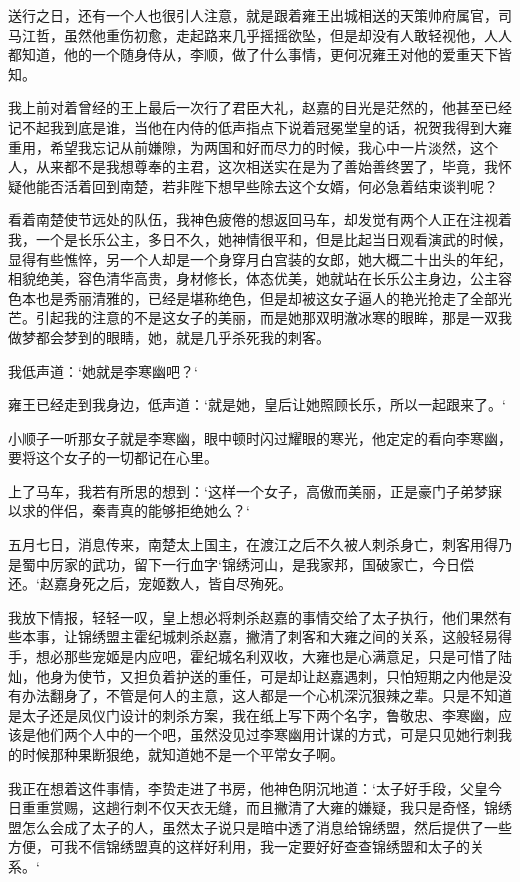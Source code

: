 送行之日，还有一个人也很引人注意，就是跟着雍王出城相送的天策帅府属官，司马江哲，虽然他重伤初愈，走起路来几乎摇摇欲坠，但是却没有人敢轻视他，人人都知道，他的一个随身侍从，李顺，做了什么事情，更何况雍王对他的爱重天下皆知。

我上前对着曾经的王上最后一次行了君臣大礼，赵嘉的目光是茫然的，他甚至已经记不起我到底是谁，当他在内侍的低声指点下说着冠冕堂皇的话，祝贺我得到大雍重用，希望我忘记从前嫌隙，为两国和好而尽力的时候，我心中一片淡然，这个人，从来都不是我想尊奉的主君，这次相送实在是为了善始善终罢了，毕竟，我怀疑他能否活着回到南楚，若非陛下想早些除去这个女婿，何必急着结束谈判呢？

看着南楚使节远处的队伍，我神色疲倦的想返回马车，却发觉有两个人正在注视着我，一个是长乐公主，多日不久，她神情很平和，但是比起当日观看演武的时候，显得有些憔悴，另一个人却是一个身穿月白宫装的女郎，她大概二十出头的年纪，相貌绝美，容色清华高贵，身材修长，体态优美，她就站在长乐公主身边，公主容色本也是秀丽清雅的，已经是堪称绝色，但是却被这女子逼人的艳光抢走了全部光芒。引起我的注意的不是这女子的美丽，而是她那双明澈冰寒的眼眸，那是一双我做梦都会梦到的眼睛，她，就是几乎杀死我的刺客。

我低声道：‘她就是李寒幽吧？‘

雍王已经走到我身边，低声道：‘就是她，皇后让她照顾长乐，所以一起跟来了。‘

小顺子一听那女子就是李寒幽，眼中顿时闪过耀眼的寒光，他定定的看向李寒幽，要将这个女子的一切都记在心里。

上了马车，我若有所思的想到：‘这样一个女子，高傲而美丽，正是豪门子弟梦寐以求的伴侣，秦青真的能够拒绝她么？‘

五月七日，消息传来，南楚太上国主，在渡江之后不久被人刺杀身亡，刺客用得乃是蜀中厉家的武功，留下一行血字‘锦绣河山，是我家邦，国破家亡，今日偿还。‘赵嘉身死之后，宠姬数人，皆自尽殉死。

我放下情报，轻轻一叹，皇上想必将刺杀赵嘉的事情交给了太子执行，他们果然有些本事，让锦绣盟主霍纪城刺杀赵嘉，撇清了刺客和大雍之间的关系，这般轻易得手，想必那些宠姬是内应吧，霍纪城名利双收，大雍也是心满意足，只是可惜了陆灿，他身为使节，又担负着护送的重任，可是却让赵嘉遇刺，只怕短期之内他是没有办法翻身了，不管是何人的主意，这人都是一个心机深沉狠辣之辈。只是不知道是太子还是凤仪门设计的刺杀方案，我在纸上写下两个名字，鲁敬忠、李寒幽，应该是他们两个人中的一个吧，虽然没见过李寒幽用计谋的方式，可是只见她行刺我的时候那种果断狠绝，就知道她不是一个平常女子啊。

我正在想着这件事情，李贽走进了书房，他神色阴沉地道：‘太子好手段，父皇今日重重赏赐，这趟行刺不仅天衣无缝，而且撇清了大雍的嫌疑，我只是奇怪，锦绣盟怎么会成了太子的人，虽然太子说只是暗中透了消息给锦绣盟，然后提供了一些方便，可我不信锦绣盟真的这样好利用，我一定要好好查查锦绣盟和太子的关系。‘

